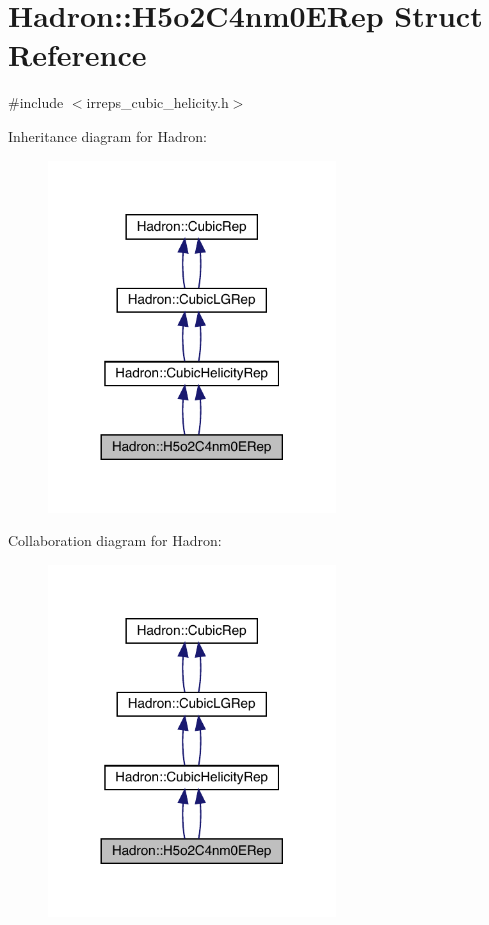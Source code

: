\hypertarget{structHadron_1_1H5o2C4nm0ERep}{}\section{Hadron\+:\+:H5o2\+C4nm0\+E\+Rep Struct Reference}
\label{structHadron_1_1H5o2C4nm0ERep}


{\ttfamily \#include $<$irreps\+\_\+cubic\+\_\+helicity.\+h$>$}



Inheritance diagram for Hadron\+:\nopagebreak
\begin{figure}[H]
\begin{center}
\leavevmode
\includegraphics[width=216pt]{d3/d8b/structHadron_1_1H5o2C4nm0ERep__inherit__graph}
\end{center}
\end{figure}


Collaboration diagram for Hadron\+:\nopagebreak
\begin{figure}[H]
\begin{center}
\leavevmode
\includegraphics[width=216pt]{de/d94/structHadron_1_1H5o2C4nm0ERep__coll__graph}
\end{center}
\end{figure}
